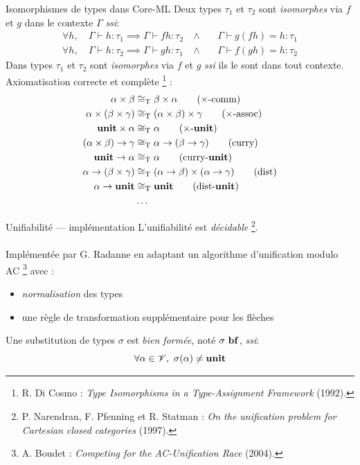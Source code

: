 \documentclass[serif]{beamer}
\newcommand{\ssi}{\textit{ssi}\xspace}
\newcommand{\unit}{\bold{unit}}
\newcommand{\V}{\mathscr{V}}
\newcommand{\T}{\mathrm{T}}
\begin{document}
\begin{frame}{Isomorphismes de types dans Core-ML}
\small
Deux types $\tau_1$ et $\tau_2$ sont \emph{isomorphes} via $f$ et $g$ dans le contexte $\Gamma$ \ssi :
\begin{align*}
		\forall h,\ &
		\Gamma \vdash h : \tau_1 \implies \Gamma \vdash f h : \tau_2 \ &
		\wedge\ &&
		\Gamma \vdash g (f h) = h : \tau_1
	\\
		\forall h,\ &
		\Gamma \vdash h : \tau_2 \implies \Gamma \vdash g h : \tau_1 \ &
		\wedge\ &&
		\Gamma \vdash f (g h) = h : \tau_2
\end{align*}
Dans types $\tau_1$ et $\tau_2$ sont \emph{isomorphes} via $f$ et $g$ \ssi ils le sont dans tout contexte. \\
Axiomatisation correcte et complète \footnote{R. Di Cosmo : \textit{Type Isomorphisms in a Type-Assignment Framework} (1992).} :
\begin{align*}
		\alpha \times \beta &\cong_\T
		\beta \times \alpha
		\label{prod_comm}
		\tag{$\times$-comm}
	\\
		\alpha \times (\beta \times \gamma) &\cong_\T
		(\alpha \times \beta) \times \gamma
		\label{prod_assoc}
		\tag{$\times$-assoc}
	\\
		\unit \times \alpha &\cong_\T
		\alpha
		\label{prod_unit}
		\tag{$\times$-$\unit$}
	\\
		(\alpha \times \beta) \rightarrow \gamma &\cong_\T
		\alpha \rightarrow (\beta \rightarrow \gamma)
		\label{curry}
		\tag{curry}
	\\
		\unit \rightarrow \alpha &\cong_\T
		\alpha
		\label{curry_unit}
		\tag{curry-$\unit$}
	\\
		\alpha \rightarrow (\beta \times \gamma) &\cong_\T
		(\alpha \rightarrow \beta) \times (\alpha \rightarrow \gamma)
		\label{dist}
		\tag{dist}
	\\
		\alpha \rightarrow \unit &\cong_\T
		\unit
		\label{dist_unit}
		\tag{dist-$\unit$}
	\\
		&\dots
\end{align*}
\end{frame}


\begin{frame}{Unifiabilité — implémentation}
\small
L'unifiabilité est \emph{décidable} \footnote{P. Narendran, F. Pfenning et R. Statman : \textit{On the unification problem for Cartesian closed categories} (1997).}.
\\~\\
Implémentée par G. Radanne en adaptant un algorithme d'unification modulo AC \footnote{A. Boudet : \textit{Competing for the AC-Unification Race} (2004).} avec :
\begin{itemize}
	\item \emph{normalisation} des types
	\item une règle de transformation supplémentaire pour les flèches
\end{itemize}
\bigskip
Une substitution de types $\sigma$ est \emph{bien formée}, noté $\sigma\ \bold{bf}$, \ssi :
	\[ \forall \alpha \in \V,\ \sigma (\alpha) \neq \unit \]
\end{frame}
\end{document}
